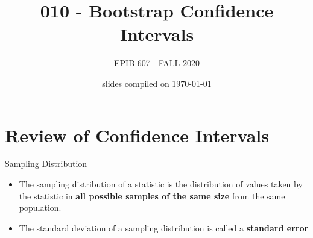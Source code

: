 \documentclass[10pt,handout]{beamer}\usepackage[]{graphicx}\usepackage[]{color}
\begin{document}
	


	\title{010 - Bootstrap Confidence Intervals}
\author{EPIB 607 - FALL 2020}

\date{slides compiled on \today}

\maketitle


\section{Review of Confidence Intervals}

\begin{frame}{Sampling Distribution}
	
	\begin{defm}
		\begin{itemize}
			\item The sampling distribution of a statistic is the distribution of values taken by the statistic in \textbf{all possible samples of the same size} from the same population.
			\item The standard deviation of a sampling distribution is called a \textbf{standard error}
		\end{itemize} 
	\end{defm}
	
	
\end{frame}
\end{document}
